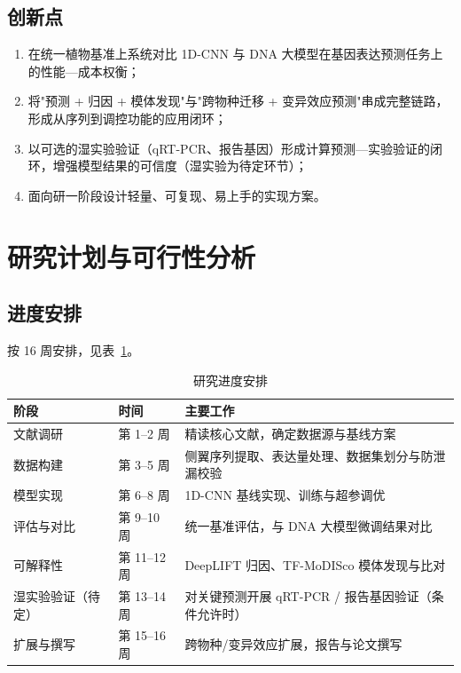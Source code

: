 \documentclass[UTF8,11pt,a4paper]{ctexart}
\begin{document}
\subsection{创新点}
\label{sec:output-novelty}

\begin{enumerate}
\item 在统一植物基准上系统对比 1D-CNN 与 DNA 大模型在基因表达预测任务上的性能—成本权衡；
\item 将"预测 + 归因 + 模体发现"与"跨物种迁移 + 变异效应预测"串成完整链路，形成从序列到调控功能的应用闭环；
\item 以可选的湿实验验证（qRT-PCR、报告基因）形成计算预测—实验验证的闭环，增强模型结果的可信度（湿实验为待定环节）；
\item 面向研一阶段设计轻量、可复现、易上手的实现方案。
\end{enumerate}

\section{研究计划与可行性分析}
\label{sec:plan}

\subsection{进度安排}
\label{sec:plan-schedule}

按 16 周安排，见表~\ref{tab:schedule}。

\begin{table}[htbp]
\centering
\caption{研究进度安排}
\label{tab:schedule}
\small
\begin{tabular}{@{}p{3.2cm}p{2.6cm}p{9.0cm}@{}}
\toprule
\textbf{阶段} & \textbf{时间} & \textbf{主要工作} \\
\midrule
文献调研 & 第 1--2 周 & 精读核心文献，确定数据源与基线方案 \\
数据构建 & 第 3--5 周 & 侧翼序列提取、表达量处理、数据集划分与防泄漏校验 \\
模型实现 & 第 6--8 周 & 1D-CNN 基线实现、训练与超参调优 \\
评估与对比 & 第 9--10 周 & 统一基准评估，与 DNA 大模型微调结果对比 \\
可解释性 & 第 11--12 周 & DeepLIFT 归因、TF-MoDISco 模体发现与比对 \\
湿实验验证（待定） & 第 13--14 周 & 对关键预测开展 qRT-PCR / 报告基因验证（条件允许时） \\
扩展与撰写 & 第 15--16 周 & 跨物种/变异效应扩展，报告与论文撰写 \\
\bottomrule
\end{tabular}
\end{table}
\end{document}
